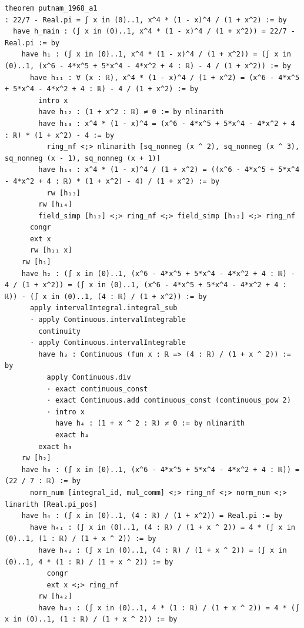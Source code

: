 \begin{tcolorbox}[colback=lightblue, boxrule=0pt, arc=5pt, outer arc=5pt, before skip=0pt, after skip=0pt, boxsep=0pt]
\begin{minipage}[t]{0.99\textwidth}
\begin{lstlisting}[language=lean, breaklines=true, style=mystyletiny]
theorem putnam_1968_a1
: 22/7 - Real.pi = ∫ x in (0)..1, x^4 * (1 - x)^4 / (1 + x^2) := by 
  have h_main : (∫ x in (0)..1, x^4 * (1 - x)^4 / (1 + x^2)) = 22/7 - Real.pi := by
    have h₁ : (∫ x in (0)..1, x^4 * (1 - x)^4 / (1 + x^2)) = (∫ x in (0)..1, (x^6 - 4*x^5 + 5*x^4 - 4*x^2 + 4 : ℝ) - 4 / (1 + x^2)) := by
      have h₁₁ : ∀ (x : ℝ), x^4 * (1 - x)^4 / (1 + x^2) = (x^6 - 4*x^5 + 5*x^4 - 4*x^2 + 4 : ℝ) - 4 / (1 + x^2) := by
        intro x
        have h₁₂ : (1 + x^2 : ℝ) ≠ 0 := by nlinarith
        have h₁₃ : x^4 * (1 - x)^4 = (x^6 - 4*x^5 + 5*x^4 - 4*x^2 + 4 : ℝ) * (1 + x^2) - 4 := by
          ring_nf <;> nlinarith [sq_nonneg (x ^ 2), sq_nonneg (x ^ 3), sq_nonneg (x - 1), sq_nonneg (x + 1)]
        have h₁₄ : x^4 * (1 - x)^4 / (1 + x^2) = ((x^6 - 4*x^5 + 5*x^4 - 4*x^2 + 4 : ℝ) * (1 + x^2) - 4) / (1 + x^2) := by
          rw [h₁₃]
        rw [h₁₄]
        field_simp [h₁₂] <;> ring_nf <;> field_simp [h₁₂] <;> ring_nf
      congr
      ext x
      rw [h₁₁ x]
    rw [h₁]
    have h₂ : (∫ x in (0)..1, (x^6 - 4*x^5 + 5*x^4 - 4*x^2 + 4 : ℝ) - 4 / (1 + x^2)) = (∫ x in (0)..1, (x^6 - 4*x^5 + 5*x^4 - 4*x^2 + 4 : ℝ)) - (∫ x in (0)..1, (4 : ℝ) / (1 + x^2)) := by
      apply intervalIntegral.integral_sub
      · apply Continuous.intervalIntegrable
        continuity
      · apply Continuous.intervalIntegrable
        have h₃ : Continuous (fun x : ℝ => (4 : ℝ) / (1 + x ^ 2)) := by
          apply Continuous.div
          · exact continuous_const
          · exact Continuous.add continuous_const (continuous_pow 2)
          · intro x
            have h₄ : (1 + x ^ 2 : ℝ) ≠ 0 := by nlinarith
            exact h₄
        exact h₃
    rw [h₂]
    have h₃ : (∫ x in (0)..1, (x^6 - 4*x^5 + 5*x^4 - 4*x^2 + 4 : ℝ)) = (22 / 7 : ℝ) := by
      norm_num [integral_id, mul_comm] <;> ring_nf <;> norm_num <;> linarith [Real.pi_pos]
    have h₄ : (∫ x in (0)..1, (4 : ℝ) / (1 + x^2)) = Real.pi := by
      have h₄₁ : (∫ x in (0)..1, (4 : ℝ) / (1 + x ^ 2)) = 4 * (∫ x in (0)..1, (1 : ℝ) / (1 + x ^ 2)) := by
        have h₄₂ : (∫ x in (0)..1, (4 : ℝ) / (1 + x ^ 2)) = (∫ x in (0)..1, 4 * (1 : ℝ) / (1 + x ^ 2)) := by
          congr
          ext x <;> ring_nf
        rw [h₄₂]
        have h₄₃ : (∫ x in (0)..1, 4 * (1 : ℝ) / (1 + x ^ 2)) = 4 * (∫ x in (0)..1, (1 : ℝ) / (1 + x ^ 2)) := by

\end{lstlisting}
\end{minipage}
\end{tcolorbox}
